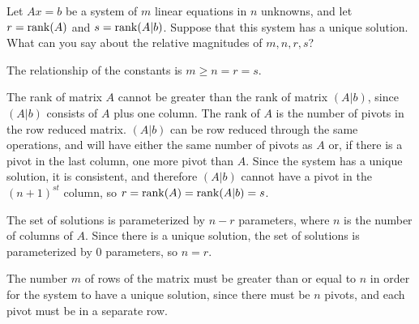\documentclass{ximera}
\begin{document}
\begin{exercise} \label{c5.2.10}
Let $Ax=b$ be a system of $m$ linear equations in $n$ unknowns,
and let $r={\rm rank}(A)$ and $s={\rm rank}(A|b)$.  Suppose that this system
has a unique solution.  What can you say about the relative
magnitudes of $m,n,r,s$?

\begin{solution}

\ans The relationship of the constants is $m \geq n = r = s$.

\soln The rank of matrix $A$ cannot be greater than the rank of matrix
$(A|b)$, since $(A|b)$ consists of $A$ plus one column.  The rank of $A$
is the number of pivots in the row reduced matrix.  $(A|b)$ can be row 
reduced through the same operations, and will have either the same number
of pivots as $A$ or, if there is a pivot in the last column, one more
pivot than $A$.  Since the system has a unique solution, it is consistent,
and therefore $(A|b)$ cannot have a pivot in the $(n + 1)^{st}$ column, so
$r = {\rm rank}(A) = {\rm rank}(A|b) = s$.

\para The set of solutions is parameterized by $n - r$ parameters,
where $n$ is the number of columns of $A$.  Since there is a unique
solution, the set of solutions is parameterized by $0$ parameters,
so $n = r$.

\para The number $m$ of rows of the matrix must be greater than or
equal to $n$ in order for the system to have a unique solution, since
there must be $n$ pivots, and each pivot must be in a separate row.



\end{solution}
\end{exercise}
\end{document}
